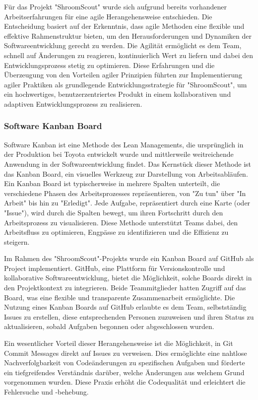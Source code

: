 \documentclass[../main.tex]{subfiles}
\begin{document}
Für das Projekt "ShroomScout" wurde sich aufgrund bereits vorhandener Arbeitserfahrungen für eine agile Herangehensweise entschieden. Die 
Entscheidung basiert auf der Erkenntnis, dass agile Methoden eine flexible und effektive Rahmenstruktur bieten, um den Herausforderungen 
und Dynamiken der Softwareentwicklung gerecht zu werden. Die Agilität ermöglicht es dem Team, schnell auf Änderungen zu reagieren, kontinuierlich 
Wert zu liefern und dabei den Entwicklungsprozess stetig zu optimieren. Diese Erfahrungen und die Überzeugung von den Vorteilen agiler Prinzipien 
führten zur Implementierung agiler Praktiken als grundlegende Entwicklungsstrategie für "ShroomScout", um ein hochwertiges, benutzerzentriertes 
Produkt in einem kollaborativen und adaptiven Entwicklungsprozess zu realisieren.

\subsubsection{Software Kanban Board}
Software Kanban ist eine Methode des Lean Managements, die ursprünglich in der Produktion bei Toyota entwickelt wurde und mittlerweile weitreichende 
Anwendung in der Softwareentwicklung findet. Das Kernstück dieser Methode ist das Kanban Board, ein visuelles Werkzeug zur Darstellung von Arbeitsabläufen. 
Ein Kanban Board ist typischerweise in mehrere Spalten unterteilt, die verschiedene Phasen des Arbeitsprozesses repräsentieren, von "Zu tun" über "In Arbeit" 
bis hin zu "Erledigt". Jede Aufgabe, repräsentiert durch eine Karte (oder "Issue"), wird durch die Spalten bewegt, um ihren Fortschritt durch den Arbeitsprozess 
zu visualisieren. Diese Methode unterstützt Teams dabei, den Arbeitsfluss zu optimieren, Engpässe zu identifizieren und die Effizienz zu steigern.

Im Rahmen des "ShroomScout"-Projekts wurde ein Kanban Board auf GitHub als Project implementiert. GitHub, eine Plattform für Versionskontrolle und kollaborative 
Softwareentwicklung, bietet die Möglichkeit, solche Boards direkt in den Projektkontext zu integrieren. Beide Teammitglieder hatten Zugriff auf das Board, was 
eine flexible und transparente Zusammenarbeit ermöglichte. Die Nutzung eines Kanban Boards auf GitHub erlaubte es dem Team, selbstständig Issues zu erstellen, 
diese entsprechenden Personen zuzuweisen und ihren Status zu aktualisieren, sobald Aufgaben begonnen oder abgeschlossen wurden.

Ein wesentlicher Vorteil dieser Herangehensweise ist die Möglichkeit, in Git Commit Messages direkt auf Issues zu verweisen. Dies ermöglichte eine nahtlose 
Nachverfolgbarkeit von Codeänderungen zu spezifischen Aufgaben und förderte ein tiefgreifendes Verständnis darüber, welche Änderungen aus welchem Grund 
vorgenommen wurden. Diese Praxis erhöht die Codequalität und erleichtert die Fehlersuche und -behebung.
\end{document}
